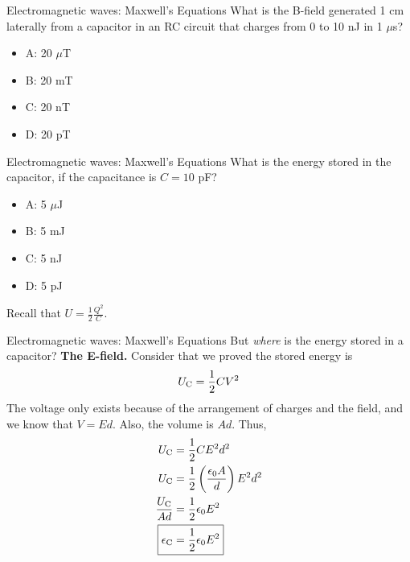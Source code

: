 \documentclass{beamer}
\begin{document}
\begin{frame}{Electromagnetic waves: Maxwell's Equations}
What is the B-field generated 1 cm laterally from a capacitor in an RC circuit that charges from 0 to 10 nJ in 1 $\mu$s?
\begin{itemize}
\item A: 20 $\mu$T
\item B: 20 mT
\item C: 20 nT
\item D: 20 pT
\end{itemize}
\end{frame}

\begin{frame}{Electromagnetic waves: Maxwell's Equations}
What is the energy stored in the capacitor, if the capacitance is $C = 10$ pF?
\begin{itemize}
\item A: 5 $\mu$J
\item B: 5 mJ
\item C: 5 nJ
\item D: 5 pJ
\end{itemize}
\small
Recall that $U = \frac{1}{2} \frac{Q^2}{C}$.
\end{frame}

\begin{frame}{Electromagnetic waves: Maxwell's Equations}
\small
But \textit{where} is the energy stored in a capacitor?  \textbf{The E-field.}  Consider that we proved the stored energy is
\begin{equation}
U_{\rm C} = \frac{1}{2} C V^2
\end{equation}
The voltage only exists because of the arrangement of charges and the field, and we know that $V = E d$.  Also, the volume is $Ad$.  Thus,
\begin{align}
U_{\rm C} &= \frac{1}{2}C E^2 d^2 \\
U_{\rm C} &= \frac{1}{2}\left(\frac{\epsilon_0 A}{d}\right) E^2 d^2 \\
\frac{U_{\rm C}}{Ad} &= \frac{1}{2}\epsilon_0 E^2 \\
\Aboxed{\epsilon_{\rm C} &= \frac{1}{2}\epsilon_0 E^2}
\end{align}
\end{frame}
\end{document}
